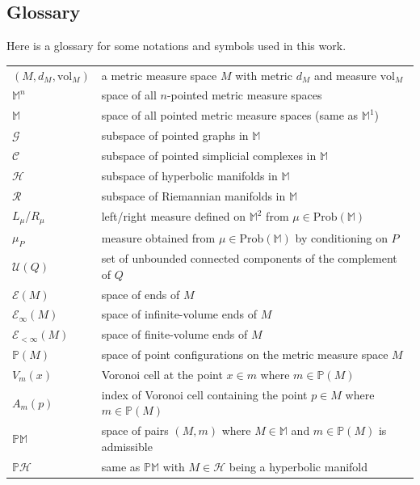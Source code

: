 \documentclass{amsart}
\newcommand{\MM}{\mathbb{M}}
\newcommand{\MP}{\mathbb{PM}}
\newcommand{\Points}{\mathbb{P}}
\newcommand{\Graphs}{\mathcal{G}}
\newcommand{\Complexes}{\mathcal{C}}
\newcommand{\Hypers}{\mathcal{H}}
\newcommand{\HypersP}{\Points\Hypers}
\newcommand{\Riemanns}{\mathcal{R}}
\newcommand{\vol}{\mathrm{vol}}
\newcommand{\Prob}[1]{\mathrm{Prob}\left(#1\right)}
\newcommand{\Ends}[1]{\mathcal{E}\left(#1\right)}
\newcommand{\EndsFin}[1]{\mathcal{E}_{<\infty}\left(#1\right)}
\newcommand{\EndsInf}[1]{\mathcal{E}_{\infty}\left(#1\right)}
\theoremstyle{plain}
\numberwithin{equation}{section}
\theoremstyle{definition}
\begin{document}
\newpage 

\subsection{Glossary}

Here is a glossary for some notations and symbols used in this work.


\begin{center}
\begin{longtable}{ll}
\hline
$(M,d_M,\vol_M)$ & a metric measure space $M$ with metric $d_M$ and measure $\vol_M$ \\
$\MM^n$ &  space of all $n$-pointed metric measure spaces \\
$\MM$ &  space of all pointed metric measure spaces (same as $\MM^1$)\\
\hline
$\Graphs$ &  subspace of pointed graphs in $\MM$\\
$\Complexes$ &  subspace of pointed simplicial complexes in $\MM$ \\
$\Hypers$ &  subspace of hyperbolic manifolds in $\MM$ \\
$\Riemanns$ &  subspace of Riemannian manifolds in $\MM$ \\
\hline
$L_\mu$/$R_\mu$ &  left/right measure defined on $\MM^2$ from $\mu\in\Prob{\MM}$  \\
$\mu_P$ &  measure obtained from $\mu\in\Prob{\MM}$ by conditioning on $P$\\
\hline
$\mathcal{U}(Q)$ & set of unbounded connected components of the complement of $Q$ \\
$\Ends{M}$ & space of ends of $M$ \\
$\EndsInf{M}$ & space of infinite-volume ends of $M$ \\
$\EndsFin{M}$ & space of finite-volume ends of $M$ \\
\hline
$\Points(M)$ & space of point configurations on the metric measure space $M$\\
$V_m(x)$ & Voronoi cell at the point $x \in m$ where $m \in \Points(M)$\\
$A_m(p)$ & index of Voronoi cell containing the point $p \in M$ where $m \in \Points(M)$\\
$\MP$ & space of pairs $(M,m)$ where $M \in \MM$ and $m \in \Points(M)$ is admissible \\
$\HypersP$ & same as $\MP$ with $M \in \Hypers$ being a hyperbolic manifold  \\

\end{longtable}
\end{center}
\end{document}
